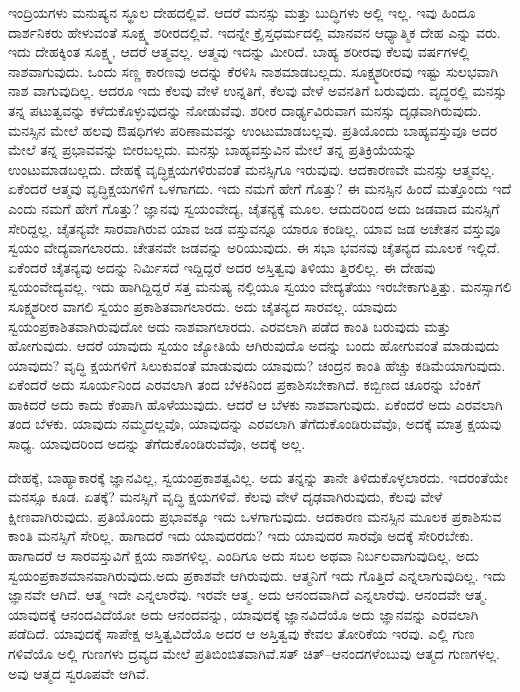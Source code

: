 ಇಂದ್ರಿಯಗಳು ಮನುಷ್ಯನ ಸ್ಥೂಲ ದೇಹದಲ್ಲಿವೆ. ಆದರೆ ಮನಸ್ಸು ಮತ್ತು ಬುದ್ಧಿಗಳು ಅಲ್ಲಿ ಇಲ್ಲ. ಇವು ಹಿಂದೂ ದಾರ್ಶನಿಕರು ಹೇಳುವಂತೆ ಸೂಕ್ಷ್ಮ ಶರೀರದಲ್ಲಿವೆ. ಇದನ್ನೇ ಕ್ರೈಸ್ತಧರ್ಮದಲ್ಲಿ ಮಾನವನ ಆಧ್ಯಾತ್ಮಿಕ ದೇಹ ಎನ್ನು ವರು. ಇದು ದೇಹಕ್ಕಿಂತ ಸೂಕ್ಷ್ಮ, ಆದರೆ ಆತ್ಮವಲ್ಲ. ಆತ್ಮವು ಇದನ್ನು ಮೀರಿದೆ. ಬಾಹ್ಯ ಶರೀರವು ಕೆಲವು ವರ್ಷಗಳಲ್ಲಿ ನಾಶವಾಗುವುದು. ಒಂದು ಸಣ್ಣ ಕಾರಣವು ಅದನ್ನು ಕೆರಳಿಸಿ ನಾಶಮಾಡಬಲ್ಲದು. ಸೂಕ್ಷ್ಮಶರೀರವು ಇಷ್ಟು ಸುಲಭವಾಗಿ ನಾಶ ವಾಗುವುದಿಲ್ಲ. ಆದರೂ ಇದು ಕೆಲವು ವೇಳೆ ಉನ್ನತಿಗೆ, ಕೆಲವು ವೇಳೆ ಅವನತಿಗೆ ಬರುವುದು. ವೃದ್ಧರಲ್ಲಿ ಮನಸ್ಸು ತನ್ನ ಪಟುತ್ವವನ್ನು ಕಳೆದುಕೊಳ್ಳುವುದನ್ನು ನೋಡುವೆವು. ಶರೀರ ದಾರ್ಢ್ಯವಿರುವಾಗ ಮನಸ್ಸು ದೃಢವಾಗಿರುವುದು. ಮನಸ್ಸಿನ ಮೇಲೆ ಹಲವು ಔಷಧಿಗಳು ಪರಿಣಾಮವನ್ನು ಉಂಟುಮಾಡಬಲ್ಲವು. ಪ್ರತಿಯೊಂದು ಬಾಹ್ಯವಸ್ತುವೂ ಅದರ ಮೇಲೆ ತನ್ನ ಪ್ರಭಾವವನ್ನು ಬೀರಬಲ್ಲದು. ಮನಸ್ಸು ಬಾಹ್ಯವಸ್ತುವಿನ ಮೇಲೆ ತನ್ನ ಪ್ರತಿಕ್ರಿಯೆಯನ್ನು ಉಂಟುಮಾಡಬಲ್ಲದು. ದೇಹಕ್ಕೆ ವೃದ್ಧಿಕ್ಷಯಗಳಿರುವಂತೆ ಮನಸ್ಸಿಗೂ ಇರುವುವು. ಆದಕಾರಣವೇ ಮನಸ್ಸು ಆತ್ಮವಲ್ಲ. ಏಕೆಂದರೆ ಆತ್ಮವು ವೃದ್ಧಿಕ್ಷಯಗಳಿಗೆ ಒಳಗಾಗದು. ಇದು ನಮಗೆ ಹೇಗೆ ಗೊತ್ತು? ಈ ಮನಸ್ಸಿನ ಹಿಂದೆ ಮತ್ತೊಂದು ಇದೆ ಎಂದು ನಮಗೆ ಹೇಗೆ ಗೊತ್ತು? ಜ್ಞಾನವು ಸ್ವಯಂವೇದ್ಯ, ಚೈತನ್ಯಕ್ಕೆ ಮೂಲ. ಆದುದರಿಂದ ಅದು ಜಡವಾದ ಮನಸ್ಸಿಗೆ ಸೇರಿದ್ದಲ್ಲ. ಚೈತನ್ಯವೇ ಸಾರವಾಗಿರುವ ಯಾವ ಜಡ ವಸ್ತುವನ್ನೂ ಯಾರೂ ಕಂಡಿಲ್ಲ. ಯಾವ ಜಡ ಅಚೇತನ ವಸ್ತುವೂ ಸ್ವಯಂ ವೇದ್ಯವಾಗಲಾರದು. ಚೇತನವೇ ಜಡವನ್ನು ಅರಿಯುವುದು. ಈ ಸಭಾ ಭವನವು ಚೈತನ್ಯದ ಮೂಲಕ ಇಲ್ಲಿದೆ. ಏಕೆಂದರೆ ಚೈತನ್ಯವು ಅದನ್ನು ನಿರ್ಮಿಸದೆ ಇದ್ದಿದ್ದರೆ ಅದರ ಅಸ್ತಿತ್ವವು ತಿಳಿಯು ತ್ತಿರಲಿಲ್ಲ. ಈ ದೇಹವು ಸ್ವಯಂವೇದ್ಯವಲ್ಲ. ಇದು ಹಾಗಿದ್ದಿದ್ದರೆ ಸತ್ತ ಮನುಷ್ಯ ನಲ್ಲಿಯೂ ಸ್ವಯಂ ವೇದ್ಯತೆಯು ಇರಬೇಕಾಗುತ್ತಿತ್ತು. ಮನಸ್ಸಾಗಲಿ ಸೂಕ್ಷ್ಮಶರೀರ ವಾಗಲಿ ಸ್ವಯಂ ಪ್ರಕಾಶಿತವಾಗಲಾರದು. ಅದು ಚೈತನ್ಯದ ಸಾರವಲ್ಲ. ಯಾವುದು ಸ್ವಯಂಪ್ರಕಾಶಿತವಾಗಿರುವುದೋ ಅದು ನಾಶವಾಗಲಾರದು. ಎರವಲಾಗಿ ಪಡೆದ ಕಾಂತಿ ಬರುವುದು ಮತ್ತು ಹೋಗುವುದು. ಆದರೆ ಯಾವುದು ಸ್ವಯಂ ಜ್ಯೋತಿಯೆ ಆಗಿರುವುದೊ ಅದನ್ನು ಬಂದು ಹೋಗುವಂತೆ ಮಾಡುವುದು ಯಾವುದು? ವೃದ್ಧಿ ಕ್ಷಯಗಳಿಗೆ ಸಿಲುಕುವಂತೆ ಮಾಡುವುದು ಯಾವುದು? ಚಂದ್ರನ ಕಾಂತಿ ಹೆಚ್ಚು ಕಡಿಮೆಯಾಗುವುದು. ಏಕೆಂದರೆ ಅದು ಸೂರ್ಯನಿಂದ ಎರವಲಾಗಿ ತಂದ ಬೆಳಕಿನಿಂದ ಪ್ರಕಾಶಿಸಬೇಕಾಗಿದೆ. ಕಬ್ಬಿಣದ ಚೂರನ್ನು ಬೆಂಕಿಗೆ ಹಾಕಿದರೆ ಅದು ಕಾದು ಕೆಂಪಾಗಿ ಹೊಳೆಯುವುದು. ಆದರೆ ಆ ಬೆಳಕು ನಾಶವಾಗುವುದು. ಏಕೆಂದರೆ ಅದು ಎರವಲಾಗಿ ತಂದ ಬೆಳಕು. ಯಾವುದು ನಮ್ಮದಲ್ಲವೊ, ಯಾವುದನ್ನು ಎರವಲಾಗಿ ತೆಗೆದುಕೊಂಡಿರುವೆವೊ, ಅದಕ್ಕೆ ಮಾತ್ರ ಕ್ಷಯವು ಸಾಧ್ಯ. ಯಾವುದರಿಂದ ಅದನ್ನು ತೆಗೆದುಕೊಂಡಿರುವೆವೊ, ಅದಕ್ಕೆ ಅಲ್ಲ.

ದೇಹಕ್ಕೆ, ಬಾಹ್ಯಾಕಾರಕ್ಕೆ ಜ್ಞಾನವಿಲ್ಲ, ಸ್ವಯಂಪ್ರಕಾಶತ್ವವಿಲ್ಲ. ಅದು ತನ್ನನ್ನು ತಾನೇ ತಿಳಿದುಕೊಳ್ಳಲಾರದು. ಇದರಂತೆಯೇ ಮನಸ್ಸೂ ಕೂಡ. ಏತಕ್ಕೆ? ಮನಸ್ಸಿಗೆ ವೃದ್ಧಿ ಕ್ಷಯಗಳಿವೆ. ಕೆಲವು ವೇಳೆ ದೃಢವಾಗಿರುವುದು, ಕೆಲವು ವೇಳೆ ಕ್ಷೀಣವಾಗಿರುವುದು. ಪ್ರತಿಯೊಂದು ಪ್ರಭಾವಕ್ಕೂ ಇದು ಒಳಗಾಗುವುದು. ಆದಕಾರಣ ಮನಸ್ಸಿನ ಮೂಲಕ ಪ್ರಕಾಶಿಸುವ ಕಾಂತಿ ಮನಸ್ಸಿಗೆ ಸೇರಿಲ್ಲ. ಹಾಗಾದರೆ ಇದು ಯಾವುದರದು? ಇದು ಯಾವುದರ ಸಾರವೊ ಅದಕ್ಕೆ ಸೇರಿರಬೇಕು. ಹಾಗಾದರೆ ಆ ಸಾರವಸ್ತುವಿಗೆ ಕ್ಷಯ ನಾಶಗಳಿಲ್ಲ. ಎಂದಿಗೂ ಅದು ಸಬಲ ಅಥವಾ ನಿರ್ಬಲವಾಗುವುದಿಲ್ಲ. ಅದು ಸ್ವಯಂಪ್ರಕಾಶಮಾನವಾಗಿರುವುದು.ಅದು ಪ್ರಕಾಶವೇ ಆಗಿರುವುದು. ಆತ್ಮನಿಗೆ ಇದು ಗೊತ್ತಿದೆ ಎನ್ನಲಾಗುವುದಿಲ್ಲ. ಇದು ಜ್ಞಾನವೇ ಆಗಿದೆ. ಆತ್ಮ ಇದೇ ಎನ್ನಲಾರೆವು. ಇರವೇ ಆತ್ಮ. ಅದು ಆನಂದವಾಗಿದೆ ಎನ್ನಲಾರೆವು. ಆನಂದವೇ ಆತ್ಮ. ಯಾವುದಕ್ಕೆ ಆನಂದವಿದೆಯೋ ಅದು ಆನಂದವನ್ನು, ಯಾವುದಕ್ಕೆ ಜ್ಞಾನವಿದೆಯೊ ಅದು ಜ್ಞಾನವನ್ನು ಎರವಲಾಗಿ ಪಡೆದಿದೆ. ಯಾವುದಕ್ಕೆ ಸಾಪೇಕ್ಷ ಅಸ್ತಿತ್ವವಿದೆಯೊ ಅದರ ಆ ಅಸ್ತಿತ್ವವು ಕೇವಲ ತೋರಿಕೆಯ ಇರವು. ಎಲ್ಲಿ ಗುಣ ಗಳಿವೆಯೊ ಅಲ್ಲಿ ಗುಣಗಳು ದ್ರವ್ಯದ ಮೇಲೆ ಪ್ರತಿಬಿಂಬಿತವಾಗಿವೆ.ಸತ್​ ಚಿತ್​–ಆನಂದಗಳೆಂಬುವು ಆತ್ಮದ ಗುಣಗಳಲ್ಲ. ಅವು ಆತ್ಮದ ಸ್ವರೂಪವೇ ಆಗಿವೆ.

